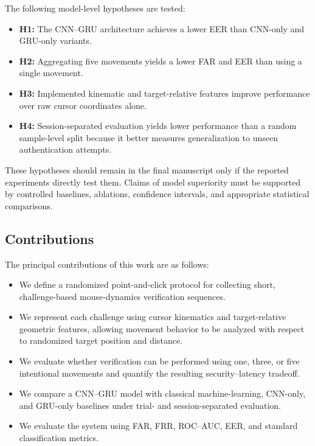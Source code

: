 \documentclass[conference]{IEEEtran}
\begin{document}
The following model-level hypotheses are tested:
\begin{itemize}
    \item \textbf{H1:} The CNN--GRU architecture achieves a lower EER than
    CNN-only and GRU-only variants.

    \item \textbf{H2:} Aggregating five movements yields a lower FAR and EER
    than using a single movement.

    \item \textbf{H3:} Implemented kinematic and target-relative features
    improve performance over raw cursor coordinates alone.

    \item \textbf{H4:} Session-separated evaluation yields lower performance
    than a random sample-level split because it better measures
    generalization to unseen authentication attempts.
\end{itemize}

These hypotheses should remain in the final manuscript only if the reported
experiments directly test them. Claims of model superiority must be
supported by controlled baselines, ablations, confidence intervals, and
appropriate statistical comparisons.

\subsection{Contributions}

The principal contributions of this work are as follows:
\begin{itemize}
    \item We define a randomized point-and-click protocol for collecting
    short, challenge-based mouse-dynamics verification sequences.

    \item We represent each challenge using cursor kinematics and
    target-relative geometric features, allowing movement behavior to be
    analyzed with respect to randomized target position and distance.

    \item We evaluate whether verification can be performed using one,
    three, or five intentional movements and quantify the resulting
    security--latency tradeoff.

    \item We compare a CNN--GRU model with classical machine-learning,
    CNN-only, and GRU-only baselines under trial- and session-separated
    evaluation.

    \item We evaluate the system using FAR, FRR, ROC--AUC, EER, and standard
    classification metrics.
\end{itemize}
\end{document}

